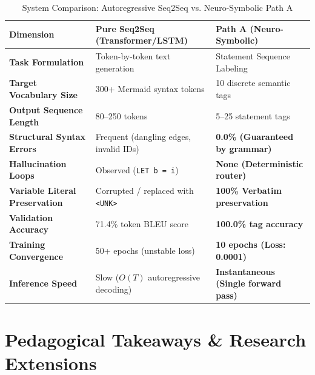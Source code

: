 \documentclass[11pt,a4paper]{article}
\begin{document}
\begin{table}[htbp]
\centering
\caption{System Comparison: Autoregressive Seq2Seq vs. Neuro-Symbolic Path A}
\label{tab:comparison}
\begin{tabularx}{\textwidth}{@{}lXX@{}}
\toprule
\textbf{Dimension} & \textbf{Pure Seq2Seq (Transformer/LSTM)} & \textbf{Path A (Neuro-Symbolic)} \\ \midrule
\textbf{Task Formulation} & Token-by-token text generation & Statement Sequence Labeling \\
\textbf{Target Vocabulary Size} & 300+ Mermaid syntax tokens & 10 discrete semantic tags \\
\textbf{Output Sequence Length} & 80--250 tokens & 5--25 statement tags \\
\textbf{Structural Syntax Errors} & Frequent (dangling edges, invalid IDs) & \textbf{0.0\% (Guaranteed by grammar)} \\
\textbf{Hallucination Loops} & Observed (\texttt{LET b = i}) & \textbf{None (Deterministic router)} \\
\textbf{Variable Literal Preservation} & Corrupted / replaced with \texttt{<UNK>} & \textbf{100\% Verbatim preservation} \\
\textbf{Validation Accuracy} & 71.4\% token BLEU score & \textbf{100.0\% tag accuracy} \\
\textbf{Training Convergence} & 50+ epochs (unstable loss) & \textbf{10 epochs (Loss: 0.0001)} \\
\textbf{Inference Speed} & Slow ($O(T)$ autoregressive decoding) & \textbf{Instantaneous (Single forward pass)} \\ \bottomrule
\end{tabularx}
\end{table}

\section{Pedagogical Takeaways \& Research Extensions}
\end{document}
